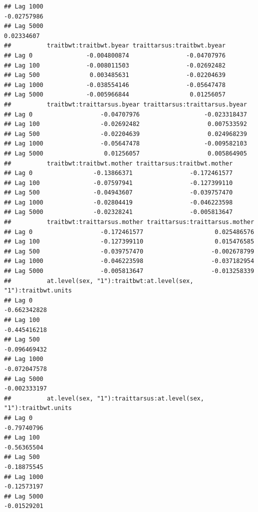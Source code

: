 \documentclass[
  12pt,
]{book}
\begin{document}
\begin{verbatim}
## Lag 1000                                                          -0.02757986
## Lag 5000                                                           0.02334607
##          traitbwt:traitbwt.byear traittarsus:traitbwt.byear
## Lag 0               -0.004800874                -0.04707976
## Lag 100             -0.008011503                -0.02692482
## Lag 500              0.003485631                -0.02204639
## Lag 1000            -0.038554146                -0.05647478
## Lag 5000            -0.005966844                 0.01256057
##          traitbwt:traittarsus.byear traittarsus:traittarsus.byear
## Lag 0                   -0.04707976                  -0.023318437
## Lag 100                 -0.02692482                   0.007533592
## Lag 500                 -0.02204639                   0.024968239
## Lag 1000                -0.05647478                  -0.009582103
## Lag 5000                 0.01256057                   0.005864905
##          traitbwt:traitbwt.mother traittarsus:traitbwt.mother
## Lag 0                 -0.13866371                -0.172461577
## Lag 100               -0.07597941                -0.127399110
## Lag 500               -0.04943607                -0.039757470
## Lag 1000              -0.02804419                -0.046223598
## Lag 5000              -0.02328241                -0.005813647
##          traitbwt:traittarsus.mother traittarsus:traittarsus.mother
## Lag 0                   -0.172461577                    0.025486576
## Lag 100                 -0.127399110                    0.015476585
## Lag 500                 -0.039757470                   -0.002678799
## Lag 1000                -0.046223598                   -0.037182954
## Lag 5000                -0.005813647                   -0.013258339
##          at.level(sex, "1"):traitbwt:at.level(sex, "1"):traitbwt.units
## Lag 0                                                     -0.662342828
## Lag 100                                                   -0.445416218
## Lag 500                                                   -0.096469432
## Lag 1000                                                  -0.072047578
## Lag 5000                                                  -0.002333197
##          at.level(sex, "1"):traittarsus:at.level(sex, "1"):traitbwt.units
## Lag 0                                                         -0.79740796
## Lag 100                                                       -0.56365504
## Lag 500                                                       -0.18875545
## Lag 1000                                                      -0.12573197
## Lag 5000                                                      -0.01529201

\end{verbatim}
\end{document}
